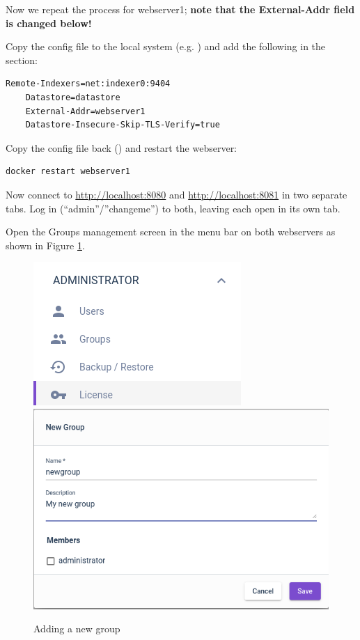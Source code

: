 Now we repeat the process for webserver1; \textbf{note that the External-Addr field is changed below!}

Copy the config file to the local system
(e.g. )
and add the following in the \code{[Global]} section:

\begin{Verbatim}[breaklines=true]
    Remote-Indexers=net:indexer0:9404
    Datastore=datastore
    External-Addr=webserver1
    Datastore-Insecure-Skip-TLS-Verify=true
\end{Verbatim}

Copy the config file back ()
and restart the webserver:

\begin{Verbatim}[breaklines=true]
docker restart webserver1
\end{Verbatim}

Now connect to
\href{http://localhost:8080}{http://localhost:8080} and
\href{http://localhost:8081}{http://localhost:8081} in two separate tabs.
Log in (``admin''/''changeme'') to both,
leaving each open in its own tab.

Open the Groups management screen in the menu bar on both webservers as shown in Figure \ref{fig:webserver-lab-newgroup}.

\begin{figure}
\includegraphics[width=0.4\linewidth]{images/groups-menu.png}\includegraphics[width=0.5\linewidth]{images/groups-new.png}
\caption{Adding a new group}
\label{fig:webserver-lab-newgroup}
\end{figure}

